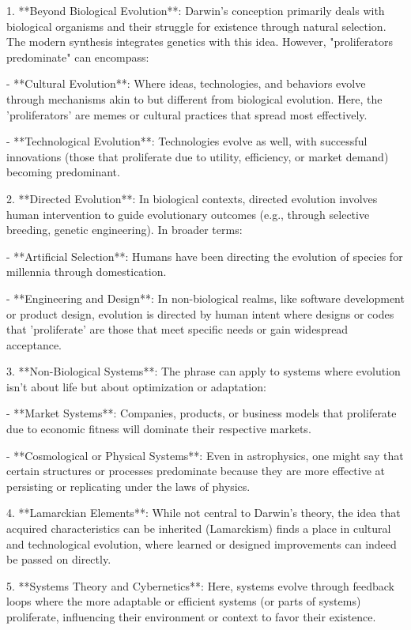 \documentclass[10pt,titlepage]{book}
\begin{document}
1. **Beyond Biological Evolution**: Darwin's conception primarily deals with biological organisms and their struggle for existence through natural selection. The modern synthesis integrates genetics with this idea. However, "proliferators predominate" can encompass:

   - **Cultural Evolution**: Where ideas, technologies, and behaviors evolve through mechanisms akin to but different from biological evolution. Here, the 'proliferators' are memes or cultural practices that spread most effectively.

   - **Technological Evolution**: Technologies evolve as well, with successful innovations (those that proliferate due to utility, efficiency, or market demand) becoming predominant.

2. **Directed Evolution**: In biological contexts, directed evolution involves human intervention to guide evolutionary outcomes (e.g., through selective breeding, genetic engineering). In broader terms:

   - **Artificial Selection**: Humans have been directing the evolution of species for millennia through domestication.

   - **Engineering and Design**: In non-biological realms, like software development or product design, evolution is directed by human intent where designs or codes that 'proliferate' are those that meet specific needs or gain widespread acceptance.

3. **Non-Biological Systems**: The phrase can apply to systems where evolution isn't about life but about optimization or adaptation:

   - **Market Systems**: Companies, products, or business models that proliferate due to economic fitness will dominate their respective markets.

   - **Cosmological or Physical Systems**: Even in astrophysics, one might say that certain structures or processes predominate because they are more effective at persisting or replicating under the laws of physics.

4. **Lamarckian Elements**: While not central to Darwin's theory, the idea that acquired characteristics can be inherited (Lamarckism) finds a place in cultural and technological evolution, where learned or designed improvements can indeed be passed on directly.

5. **Systems Theory and Cybernetics**: Here, systems evolve through feedback loops where the more adaptable or efficient systems (or parts of systems) proliferate, influencing their environment or context to favor their existence.
\end{document}
